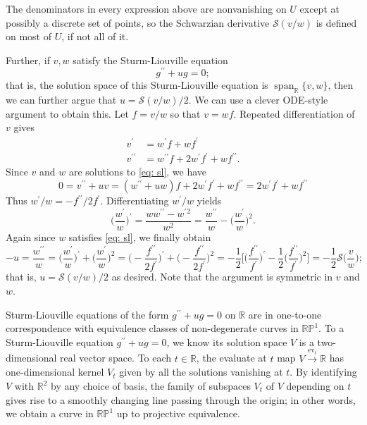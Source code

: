 \documentclass[11pt,leqno]{article}
\theoremstyle{plain}
\theoremstyle{definition}
\numberwithin{equation}{section}
\numberwithin{lem}{section}
\DeclareMathOperator{\Span}{span}
\renewcommand{\ev}{\mathrm{ev}}
\begin{document}
The denominators in every expression above are nonvanishing on $U$ except at possibly a discrete set of points, so the Schwarzian derivative $\mathscr S(v/w)$ is defined on most of $U$, if not all of it.

Further, if $v,w$ satisfy the Sturm-Liouville equation
\begin{equation}\label{eq: sl}
    g^{\prime\prime} + ug = 0;
\end{equation}
that is, the solution space of this Sturm-Liouville equation is $\Span_{\mathbb R}\{v,w\}$, then we can further argue that $u = \mathscr S(v/w)/2$. We can use a clever ODE-style argument to obtain this. Let $f = v/w$ so that $v = wf$. Repeated differentiation of $v$ gives 
\begin{align*}
    v^\prime &= w^\prime f + wf^\prime\\
    v^{\prime\prime} &= w^{\prime\prime}f + 2w^\prime f^\prime + wf^{\prime\prime}.
\end{align*}
Since $v$ and $w$ are solutions to \cref{eq: sl}, we have 
\[0 = v^{\prime\prime} + uv = (w^{\prime\prime} + uw)f + 2w^\prime f^\prime + wf^{\prime\prime} = 2w^\prime f^\prime + wf^{\prime\prime}\]
Thus $w^\prime/w = -f^{\prime\prime}/2f^\prime$. Differentiating $w^\prime/w$ yields
\[\biggl(\frac{w^\prime}{w}\biggr)^\prime = \frac{ww^{\prime\prime}-w^\prime{}^2}{w^2} = \frac{w^{\prime\prime}}{w}-\biggl(\frac{w^\prime}{w}\biggr)^2.\]
Again since $w$ satisfies \cref{eq: sl}, we finally obtain 
\[-u = \frac{w^{\prime\prime}}{w} = \biggl(\frac{w^\prime}{w}\biggr)^\prime+\biggl(\frac{w^\prime}{w}\biggr)^2 = \biggl(-\frac{f^{\prime\prime}}{2f^\prime}\biggr)^\prime+\biggl(-\frac{f^{\prime\prime}}{2f^\prime}\biggr)^2 = -\frac{1}{2}\biggl[\biggl(\frac{f^{\prime\prime}}{f^\prime}\biggr)^\prime-\frac{1}{2}\biggl(\frac{f^{\prime\prime}}{f^\prime}\biggr)^2\biggr]=-\frac{1}{2}\mathscr S\biggl(\frac{v}{w}\biggr);\] that is, $u = \mathscr S(v/w)/2$ as desired. Note that the argument is symmetric in $v$ and $w$.

Sturm-Liouville equations of the form $g^{\prime\prime} + ug = 0$ on $\mathbb R$ are in one-to-one correspondence with equivalence classes of non-degenerate curves in $\mathbb{RP}^1$. To a Sturm-Liouville equation $g^{\prime\prime} + ug = 0$, we know its solution space $V$ is a two-dimensional real vector space. To each $t\in \mathbb R$, the evaluate at $t$ map $V\xrightarrow{\ev_t} \mathbb R$ has one-dimensional kernel $V_t$ given by all the solutions vanishing at $t$. By identifying $V$ with $\mathbb R^2$ by any choice of basis, the family of subspaces $V_t$ of $V$ depending on $t$ gives rise to a smoothly changing line passing through the origin; in other words, we obtain a curve in $\mathbb{RP}^1$ up to projective equivalence.
\end{document}
